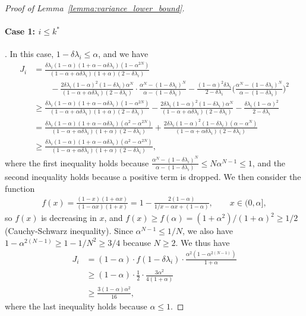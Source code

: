 \documentclass[11pt]{article}
\begin{document}
\begin{proof}[Proof of Lemma~\ref{lemma:variance_lower_bound}]
\paragraph{Case 1: $i\le k^*$}. In this case, $1-\delta\lambda_i\le\alpha$, and we have
\begin{align*}
J_i&=\frac{\delta\lambda_i(1-\alpha)(1+\alpha-\alpha\delta\lambda_i)(1-\alpha^{2N})}{(1-\alpha+\alpha\delta\lambda_i)(1+\alpha)(2-\delta\lambda_i)}\\
&\qquad-\frac{2\delta\lambda_i(1-\alpha)^2(1-\delta\lambda_i)\alpha^N}{(1-\alpha+\alpha\delta\lambda_i)(2-\delta\lambda_i)}\cdot\frac{\alpha^N-(1-\delta\lambda_i)^N}{\alpha-(1-\delta\lambda_i)}-\frac{(1-\alpha)^2\delta\lambda_i}{2-\delta\lambda_i}\bigg(\frac{\alpha^N-(1-\delta\lambda_i)^N}{\alpha-(1-\delta\lambda_i)}\bigg)^2\\
&\ge\frac{\delta\lambda_i(1-\alpha)(1+\alpha-\alpha\delta\lambda_i)(1-\alpha^{2N})}{(1-\alpha+\alpha\delta\lambda_i)(1+\alpha)(2-\delta\lambda_i)}-\frac{2\delta\lambda_i(1-\alpha)^2(1-\delta\lambda_i)\alpha^N}{(1-\alpha+\alpha\delta\lambda_i)(2-\delta\lambda_i)}-\frac{\delta\lambda_i(1-\alpha)^2}{2-\delta\lambda_i}\\
&=\frac{\delta\lambda_i(1-\alpha)(1+\alpha-\alpha\delta\lambda_i)(\alpha^2-\alpha^{2N})}{(1-\alpha+\alpha\delta\lambda_i)(1+\alpha)(2-\delta\lambda_i)}+\frac{2\delta\lambda_i(1-\alpha)^2(1-\delta\lambda_i)(\alpha-\alpha^N)}{(1-\alpha+\alpha\delta\lambda_i)(2-\delta\lambda_i)}\\
&\ge\frac{\delta\lambda_i(1-\alpha)(1+\alpha-\alpha\delta\lambda_i)(\alpha^2-\alpha^{2N})}{(1-\alpha+\alpha\delta\lambda_i)(1+\alpha)(2-\delta\lambda_i)},
\end{align*}
where the first inequality holds because $\frac{\alpha^N-(1-\delta\lambda_i)^N}{\alpha-(1-\delta\lambda_i)}\le N\alpha^{N-1}\le1$, and the second inequality holds because a positive term is dropped. We then consider the function
\begin{align*}
f(x)=\frac{(1-x)(1+\alpha x)}{(1-\alpha x)(1+x)}=1-\frac{2(1-\alpha)}{1/x-\alpha x+(1-\alpha)},\qquad x\in(0, \alpha],
\end{align*}
so $f(x)$ is decreasing in $x$, and $f(x)\ge f(\alpha)=(1+\alpha^2)/(1+\alpha)^2\ge1/2$ (Cauchy-Schwarz inequality). Since $\alpha^{N-1}\le1/N$, we also have $1-\alpha^{2(N-1)}\ge1-1/N^2\ge3/4$ because $N\ge2$. We thus have
\begin{align*}
J_i&=(1-\alpha)\cdot f(1-\delta\lambda_i)\cdot\frac{\alpha^2(1-\alpha^{2(N-1)})}{1+\alpha}\\
&\ge(1-\alpha)\cdot\frac12\cdot\frac{3\alpha^2}{4(1+\alpha)}\\
&\ge\frac{3(1-\alpha)\alpha^2}{16},
\end{align*}
where the last inequality holds because $\alpha\le1$.


\end{proof}
\end{document}
